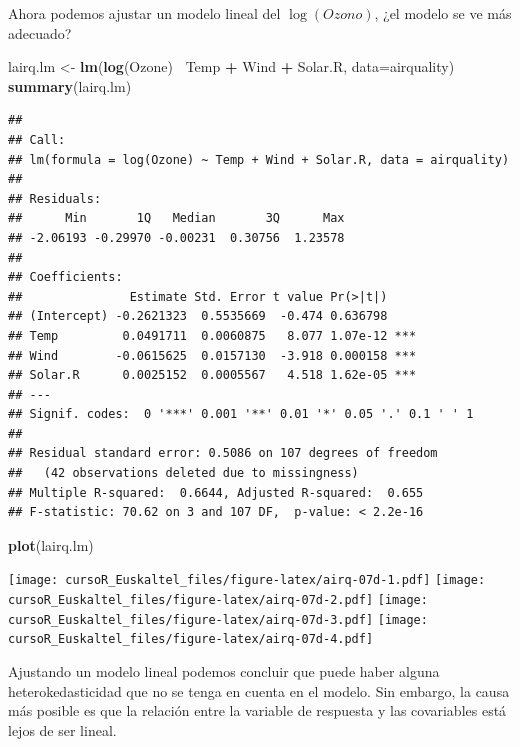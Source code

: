 \documentclass[]{book}
\newenvironment{Shaded}{\begin{snugshade}}{\end{snugshade}}
\newcommand{\KeywordTok}[1]{\textcolor[rgb]{0.13,0.29,0.53}{\textbf{#1}}}
\newcommand{\DataTypeTok}[1]{\textcolor[rgb]{0.13,0.29,0.53}{#1}}
\newcommand{\StringTok}[1]{\textcolor[rgb]{0.31,0.60,0.02}{#1}}
\newcommand{\OperatorTok}[1]{\textcolor[rgb]{0.81,0.36,0.00}{\textbf{#1}}}
\newcommand{\NormalTok}[1]{#1}
\begin{document}
Ahora podemos ajustar un modelo lineal del \(\log(Ozono)\), ¿el modelo
se ve más adecuado?

\begin{Shaded}
\begin{Highlighting}[]
\NormalTok{lairq.lm <-}\StringTok{ }\KeywordTok{lm}\NormalTok{(}\KeywordTok{log}\NormalTok{(Ozone)}\OperatorTok{~}\StringTok{ }\NormalTok{Temp }\OperatorTok{+}\StringTok{ }\NormalTok{Wind }\OperatorTok{+}\StringTok{ }\NormalTok{Solar.R, }\DataTypeTok{data=}\NormalTok{airquality)}
\KeywordTok{summary}\NormalTok{(lairq.lm)}
\end{Highlighting}
\end{Shaded}

\begin{verbatim}
## 
## Call:
## lm(formula = log(Ozone) ~ Temp + Wind + Solar.R, data = airquality)
## 
## Residuals:
##      Min       1Q   Median       3Q      Max 
## -2.06193 -0.29970 -0.00231  0.30756  1.23578 
## 
## Coefficients:
##               Estimate Std. Error t value Pr(>|t|)    
## (Intercept) -0.2621323  0.5535669  -0.474 0.636798    
## Temp         0.0491711  0.0060875   8.077 1.07e-12 ***
## Wind        -0.0615625  0.0157130  -3.918 0.000158 ***
## Solar.R      0.0025152  0.0005567   4.518 1.62e-05 ***
## ---
## Signif. codes:  0 '***' 0.001 '**' 0.01 '*' 0.05 '.' 0.1 ' ' 1
## 
## Residual standard error: 0.5086 on 107 degrees of freedom
##   (42 observations deleted due to missingness)
## Multiple R-squared:  0.6644, Adjusted R-squared:  0.655 
## F-statistic: 70.62 on 3 and 107 DF,  p-value: < 2.2e-16
\end{verbatim}

\begin{Shaded}
\begin{Highlighting}[]
\KeywordTok{plot}\NormalTok{(lairq.lm)}
\end{Highlighting}
\end{Shaded}

\texttt{[image: cursoR\_Euskaltel\_files/figure-latex/airq-07d-1.pdf]}
\texttt{[image: cursoR\_Euskaltel\_files/figure-latex/airq-07d-2.pdf]}
\texttt{[image: cursoR\_Euskaltel\_files/figure-latex/airq-07d-3.pdf]}
\texttt{[image: cursoR\_Euskaltel\_files/figure-latex/airq-07d-4.pdf]}

Ajustando un modelo lineal podemos concluir que puede haber alguna
heterokedasticidad que no se tenga en cuenta en el modelo. Sin embargo,
la causa más posible es que la relación entre la variable de respuesta y
las covariables está lejos de ser lineal.
\end{document}
